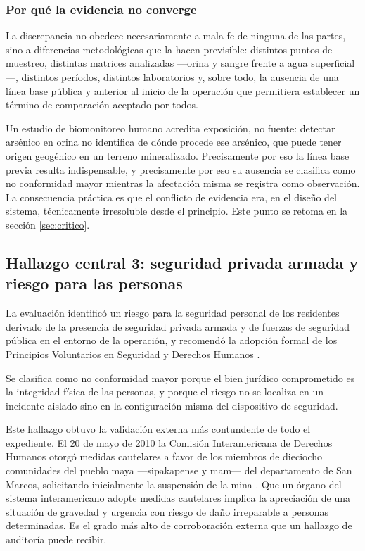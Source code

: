 \subsubsection{Por qué la evidencia no converge}

La discrepancia no obedece necesariamente a mala fe de ninguna de las partes, sino
a diferencias metodológicas que la hacen previsible: distintos puntos de muestreo,
distintas matrices analizadas —orina y sangre frente a agua superficial—,
distintos períodos, distintos laboratorios y, sobre todo, la ausencia de una línea
base pública y anterior al inicio de la operación que permitiera establecer un
término de comparación aceptado por todos.

Un estudio de biomonitoreo humano acredita exposición, no fuente: detectar
arsénico en orina no identifica de dónde procede ese arsénico, que puede tener
origen geogénico en un terreno mineralizado. Precisamente por eso la línea base
previa resulta indispensable, y precisamente por eso su ausencia se clasifica como
no conformidad mayor mientras la afectación misma se registra como observación. La
consecuencia práctica es que el conflicto de evidencia era, en el diseño del
sistema, técnicamente irresoluble desde el principio. Este punto se retoma en la
sección \ref{sec:critico}.

\subsection{Hallazgo central 3: seguridad privada armada y riesgo para las personas}

La evaluación identificó un riesgo para la seguridad personal de los residentes
derivado de la presencia de seguridad privada armada y de fuerzas de seguridad
pública en el entorno de la operación, y recomendó la adopción formal de los
Principios Voluntarios en Seguridad y Derechos Humanos
\parencite{oncommonground2010hria, vpshrsfprincipios}.

Se clasifica como no conformidad mayor porque el bien jurídico comprometido es la
integridad física de las personas, y porque el riesgo no se localiza en un
incidente aislado sino en la configuración misma del dispositivo de seguridad.

Este hallazgo obtuvo la validación externa más contundente de todo el expediente.
El 20 de mayo de 2010 la Comisión Interamericana de Derechos Humanos otorgó
medidas cautelares a favor de los miembros de dieciocho comunidades del pueblo
maya —sipakapense y mam— del departamento de San Marcos, solicitando inicialmente
la suspensión de la mina \parencite{cidh2010medidas}. Que un órgano del sistema
interamericano adopte medidas cautelares implica la apreciación de una situación
de gravedad y urgencia con riesgo de daño irreparable a personas determinadas. Es
el grado más alto de corroboración externa que un hallazgo de auditoría puede
recibir.

